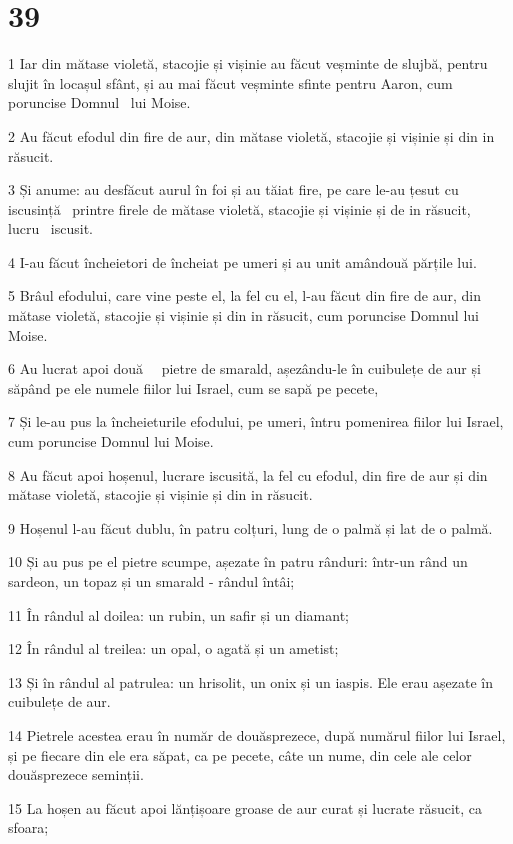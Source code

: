 \chapter{39}

\par 1 Iar din mătase violetă, stacojie și vișinie au făcut veșminte de slujbă, pentru slujit în locașul sfânt, și au mai făcut veșminte sfinte pentru Aaron, cum poruncise Domnul  lui Moise.
\par 2 Au făcut efodul din fire de aur, din mătase violetă, stacojie și vișinie și din in răsucit.
\par 3 Și anume: au desfăcut aurul în foi și au tăiat fire, pe care le-au țesut cu iscusință  printre firele de mătase violetă, stacojie și vișinie și de in răsucit, lucru  iscusit.
\par 4 I-au făcut încheietori de încheiat pe umeri și au unit amândouă părțile lui.
\par 5 Brâul efodului, care vine peste el, la fel cu el, l-au făcut din fire de aur, din mătase violetă, stacojie și vișinie și din in răsucit, cum poruncise Domnul lui Moise.
\par 6 Au lucrat apoi două   pietre de smarald, așezându-le în cuibulețe de aur și săpând pe ele numele fiilor lui Israel, cum se sapă pe pecete,
\par 7 Și le-au pus la încheieturile efodului, pe umeri, întru pomenirea fiilor lui Israel, cum poruncise Domnul lui Moise.
\par 8 Au făcut apoi hoșenul, lucrare iscusită, la fel cu efodul, din fire de aur și din mătase violetă, stacojie și vișinie și din in răsucit.
\par 9 Hoșenul l-au făcut dublu, în patru colțuri, lung de o palmă și lat de o palmă.
\par 10 Și au pus pe el pietre scumpe, așezate în patru rânduri: într-un rând un sardeon, un topaz și un smarald - rândul întâi;
\par 11 În rândul al doilea: un rubin, un safir și un diamant;
\par 12 În rândul al treilea: un opal, o agată și un ametist;
\par 13 Și în rândul al patrulea: un hrisolit, un onix și un iaspis. Ele erau așezate în cuibulețe de aur.
\par 14 Pietrele acestea erau în număr de douăsprezece, după numărul fiilor lui Israel, și pe fiecare din ele era săpat, ca pe pecete, câte un nume, din cele ale celor douăsprezece seminții.
\par 15 La hoșen au făcut apoi lănțișoare groase de aur curat și lucrate răsucit, ca sfoara;
